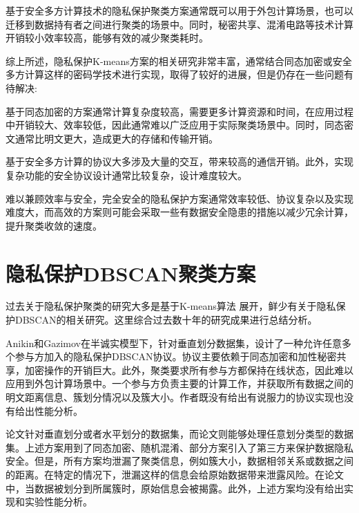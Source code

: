 基于安全多方计算技术的隐私保护聚类方案通常既可以用于外包计算场景，也可以迁移到数据持有者之间进行聚类的场景中。同时，秘密共享、混淆电路等技术计算开销较小效率较高，能够有效的减少聚类耗时。

综上所述，隐私保护K-means方案的相关研究非常丰富，通常结合同态加密或安全多方计算这样的密码学技术进行实现，取得了较好的进展，但是仍存在一些问题有待解决:
\begin{compactitem}
	\item 基于同态加密的方案通常计算复杂度较高，需要更多计算资源和时间，在应用过程中开销较大、效率较低，因此通常难以广泛应用于实际聚类场景中。同时，同态密文通常比明文更大，造成更大的存储和传输开销。
	\item 基于安全多方计算的协议大多涉及大量的交互，带来较高的通信开销。此外，实现复杂功能的安全协议设计通常比较复杂，设计难度较大。
	\item 难以兼顾效率与安全，完全安全的隐私保护方案通常效率较低、协议复杂以及实现难度大，而高效的方案则可能会采取一些有数据安全隐患的措施以减少冗余计算，提升聚类收敛的速度。
\end{compactitem}

\section{隐私保护DBSCAN聚类方案}
过去关于隐私保护聚类的研究大多是基于K-means算法  展开，鲜少有关于隐私保护DBSCAN的相关研究。这里综合过去数十年的研究成果进行总结分析。

Anikin和Gazimov\cite{anikin2017privacy}在半诚实模型下，针对垂直划分数据集，设计了一种允许任意多个参与方加入的隐私保护DBSCAN协议。协议主要依赖于同态加密和加性秘密共享，加密操作的开销巨大。此外，聚类要求所有参与方都保持在线状态，因此难以应用到外包计算场景中。一个参与方负责主要的计算工作，并获取所有数据之间的明文距离信息、簇划分情况以及簇大小。作者既没有给出有说服力的协议实现也没有给出性能分析。

论文\cite{2006Privacy,jiang2008privacy,kumar2007privacy,liu2012privacy,xu2007protocols}针对垂直划分或者水平划分的数据集，而论文\cite{almutairi2018secure,liu2012privacy}则能够处理任意划分类型的数据集。上述方案用到了同态加密、随机混淆、部分方案引入了第三方来保护数据隐私安全。但是，所有方案均泄漏了聚类信息，例如簇大小，数据相邻关系\cite{almutairi2018secure,jiang2008privacy,kumar2007privacy,liu2012privacy,rahman2017towards}或数据之间的距离\cite{2006Privacy}。在特定的情况下，泄漏这样的信息会给原始数据带来泄露风险\cite{kumar2007privacy,liu2012privacy}。在论文\cite{xu2007protocols}中，当数据被划分到所属簇时，原始信息会被揭露。此外，上述方案均没有给出实现和实验性能分析。

